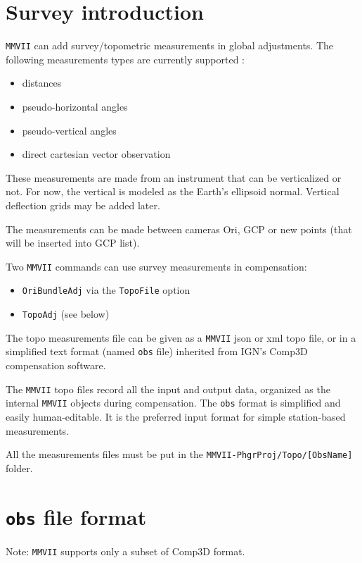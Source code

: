 \section{Survey introduction}

{\tt MMVII} can add survey/topometric measurements in global adjustments.
The following measurements types are currently supported :

\begin{itemize}
    \item distances
    \item pseudo-horizontal angles
    \item pseudo-vertical angles
    \item direct cartesian vector observation
\end{itemize}

These measurements are made from an instrument that can be verticalized or not.
For now, the vertical is modeled as the Earth's ellipsoid normal. Vertical deflection grids may be added later.

The measurements can be made between cameras Ori, GCP or new points (that will be inserted into GCP list).

Two {\tt MMVII} commands can use survey measurements in compensation:
\begin{itemize}
    \item {\tt OriBundleAdj} via the {\tt TopoFile} option
    \item {\tt TopoAdj} (see below)
\end{itemize}

The topo measurements file can be given as a {\tt MMVII} json or xml topo file, or in a simplified text format (named {\tt obs} file) inherited from IGN's Comp3D compensation software.

The {\tt MMVII} topo files record all the input and output data, organized as the internal {\tt MMVII} objects during compensation.
The {\tt obs} format is simplified and easily human-editable. It is the preferred input format for simple station-based measurements.

All the measurements files must be put in the {\tt MMVII-PhgrProj/Topo/[ObsName]} folder.

\section{{\tt obs} file format}
\label{sec:compObsFormat}
Note: {\tt MMVII} supports only a subset of Comp3D format.

